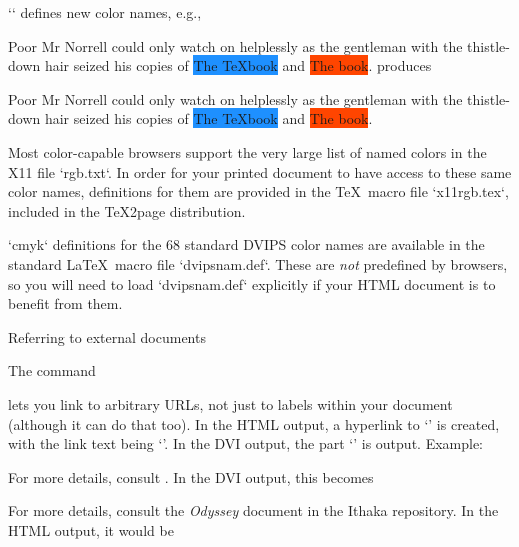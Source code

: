 `\definecolor` defines new color names, e.g.,

\begintt
{}

Poor Mr Norrell could only watch on helplessly as the gentleman
with the {\color{thistle}thistle-down hair} seized his
copies of \colorbox{dodgerblue}{\color{white}The \TeX book} and
\colorbox{orangered}{\color{white} The \MF book}.
\endtt
produces

\quote
Poor Mr Norrell could only watch on helplessly as the gentleman
with the {\color{thistle}thistle-down hair} seized his
copies of \colorbox{dodgerblue}{\color{white}The \TeX book} and
\colorbox{orangered}{\color{white} The \MF book}.
\endquote

Most color-capable browsers support the very large list
of named colors in the X11 file `rgb.txt`.  In order
for your printed document to have access to these same
color names, definitions for them are provided in the
\TeX\ macro file `x11rgb.tex`, included in the \TeX2page
distribution.


`cmyk` definitions for the 68 standard DVIPS
color names are available in the standard \LaTeX\ macro
file `dvipsnam.def`.  These are {\em not} predefined
by browsers, so you will need to load `dvipsnam.def`
explicitly if your HTML document is to benefit from
them.

 Referring to external documents

%
The command

\begintt
{}
\endtt
%
lets
you link to arbitrary URLs, not just to labels within
your document (although it can do that too).  In the
HTML output, a hyperlink to ‘’ is created, with
the link text being ‘’.  In the DVI
output, the part ‘’ is output.  Example:

\begintt
For more details, consult
.
\endtt
%
In the DVI output, this becomes

\quote
For more details, consult the {\it Odyssey\/} document in the
Ithaka repository.
\endquote
In the HTML output, it would be

